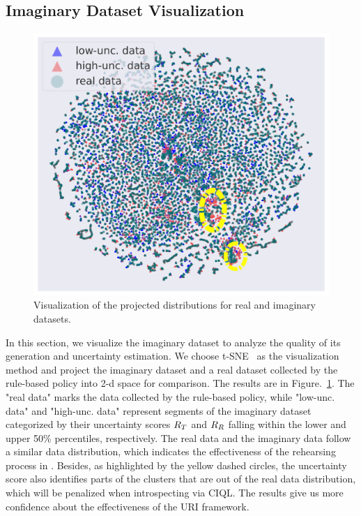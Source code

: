 \subsection{Imaginary Dataset Visualization}  
\begin{figure}
\vspace{-0.7cm}
    \begin{center}\includegraphics[width=0.95\linewidth]{fig/exp/tsne-1.png}
        \caption{Visualization of the projected distributions for real and imaginary datasets. }
        \label{fig:vis}
    \end{center}
    \vspace{-0.2cm}
\end{figure}
In this section, we visualize the imaginary dataset to analyze the quality of its generation and uncertainty estimation.  We choose t-SNE~\citep{mataten2008tsne} as the visualization method and project the imaginary dataset and a real dataset collected by the rule-based policy into 2-d space for comparison. The results are in Figure.~\ref{fig:vis}. The "real data" marks the data collected by the rule-based policy, while "low-unc. data" and "high-unc. data" represent segments of the imaginary dataset categorized by their uncertainty scores $R_T$ and $R_{R}$ falling within the lower and upper 50\% percentiles, respectively. The real data and the imaginary data follow a similar data distribution, which indicates the effectiveness of the rehearsing process in \algo. Besides, as highlighted by the yellow dashed circles, the uncertainty score also identifies parts of the clusters that are out of the real data distribution, which will be penalized when introspecting via CIQL. The results give us more confidence about the effectiveness of the URI framework.

